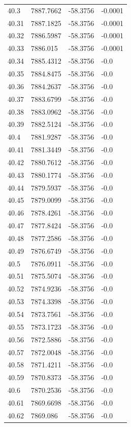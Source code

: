\begin{table}[H]
\begin{tabular}{llll}
40.3 & 7887.7662 & -58.3756 & -0.0001 \\
40.31 & 7887.1825 & -58.3756 & -0.0001 \\
40.32 & 7886.5987 & -58.3756 & -0.0001 \\
40.33 & 7886.015 & -58.3756 & -0.0001 \\
40.34 & 7885.4312 & -58.3756 & -0.0 \\
40.35 & 7884.8475 & -58.3756 & -0.0 \\
40.36 & 7884.2637 & -58.3756 & -0.0 \\
40.37 & 7883.6799 & -58.3756 & -0.0 \\
40.38 & 7883.0962 & -58.3756 & -0.0 \\
40.39 & 7882.5124 & -58.3756 & -0.0 \\
40.4 & 7881.9287 & -58.3756 & -0.0 \\
40.41 & 7881.3449 & -58.3756 & -0.0 \\
40.42 & 7880.7612 & -58.3756 & -0.0 \\
40.43 & 7880.1774 & -58.3756 & -0.0 \\
40.44 & 7879.5937 & -58.3756 & -0.0 \\
40.45 & 7879.0099 & -58.3756 & -0.0 \\
40.46 & 7878.4261 & -58.3756 & -0.0 \\
40.47 & 7877.8424 & -58.3756 & -0.0 \\
40.48 & 7877.2586 & -58.3756 & -0.0 \\
40.49 & 7876.6749 & -58.3756 & -0.0 \\
40.5 & 7876.0911 & -58.3756 & -0.0 \\
40.51 & 7875.5074 & -58.3756 & -0.0 \\
40.52 & 7874.9236 & -58.3756 & -0.0 \\
40.53 & 7874.3398 & -58.3756 & -0.0 \\
40.54 & 7873.7561 & -58.3756 & -0.0 \\
40.55 & 7873.1723 & -58.3756 & -0.0 \\
40.56 & 7872.5886 & -58.3756 & -0.0 \\
40.57 & 7872.0048 & -58.3756 & -0.0 \\
40.58 & 7871.4211 & -58.3756 & -0.0 \\
40.59 & 7870.8373 & -58.3756 & -0.0 \\
40.6 & 7870.2536 & -58.3756 & -0.0 \\
40.61 & 7869.6698 & -58.3756 & -0.0 \\
40.62 & 7869.086 & -58.3756 & -0.0 \\

\end{tabular}
\end{table}
